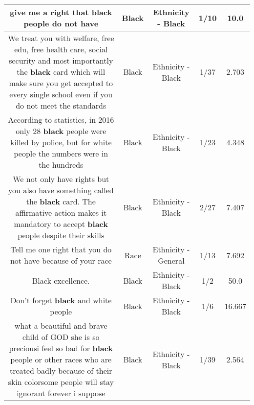 \documentclass[11pt]{article}
\newlength\mylength
\begin{document}
\begin{center}
\begin{longtable}{|C{.65\mylength}|C{.30\mylength}|C{.12\mylength}|C{.12\mylength}|C{.12\mylength}|}
  \small give me a right that \textbf{black} people do not have\normalsize   & Black & Ethnicity - Black & 1/10 & 10.0 \\  \hline
  \small We treat you with welfare, free edu, free health care, social security and most importantly the \textbf{black} card which will make sure you get accepted to every single school even if you do not meet the standards\normalsize   & Black & Ethnicity - Black & 1/37 & 2.703 \\  \hline
  \small According to statistics, in 2016 only 28 \textbf{black} people were killed by police, but for white people the numbers were in the hundreds\normalsize   & Black & Ethnicity - Black & 1/23 & 4.348 \\  \hline
  \small We not only have rights but you also have something called the \textbf{black} card. The affirmative action makes it mandatory to accept \textbf{black} people despite their skills\normalsize   & Black & Ethnicity - Black & 2/27 & 7.407 \\  \hline
  \small Tell me one right that you do not have because of your race\normalsize   & Race & Ethnicity - General & 1/13 & 7.692 \\  \hline
  \small Black excellence.\normalsize   & Black & Ethnicity - Black & 1/2 & 50.0 \\  \hline
  \small Don't forget \textbf{black} and white people\normalsize   & Black & Ethnicity - Black & 1/6 & 16.667 \\  \hline
  \small what a beautiful and brave child of GOD she is so preciousi feel so bad for \textbf{black} people or other races who are treated badly because of their skin colorsome people will stay ignorant forever i suppose\normalsize   & Black & Ethnicity - Black & 1/39 & 2.564 \\  \hline

\end{longtable}
\end{center}
\end{document}
